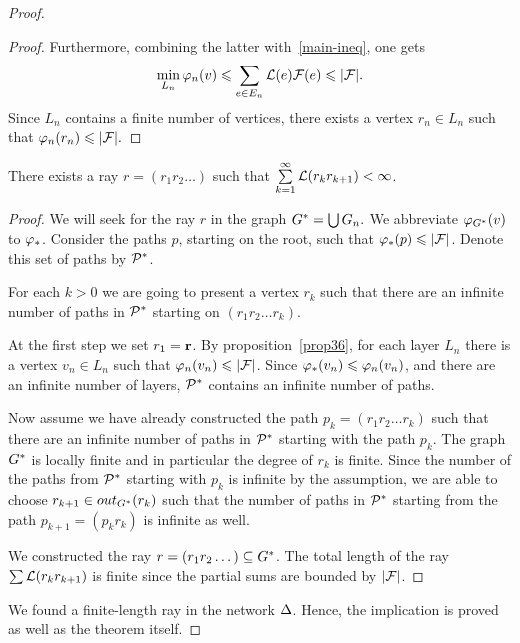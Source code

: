\documentclass[12pt,oneside,a4paper]{amsart}
\begin{document}
\begin{proof}
\begin{proof}
            Furthermore, combining the latter with~\eqref{main-ineq}, one gets
              \[
              \min_{L_n} \phi_n(v) \leq \sum_{e \in E_n} \len(e) \flowpos(e) \leq \lvert\flowpos\rvert.
              \]
            Since $L_n$ contains a finite number of vertices, there exists a vertex $r_n \in L_n$ such that
              $\phi_n(r_n) \leq \lvert\flowpos\rvert.$
          \end{proof}
          \begin{prop}
            There exists a ray $r=(r_1 r_2\dots)$ such that $\sum\limits_{k=1}^\infty \len(r_k r_{k+1}) < \infty$.
          \end{prop}
          \begin{proof}
            We will seek for the ray $r$ in the graph $\gstar = \bigcup G_n.$
            We abbreviate $\phi_{\gstar}(v)$ to $\phistar$.
            Consider the paths $p$, starting on the root, such that $\phistar(p) \leq \lvert\flowpos\rvert$.
            Denote this set of paths by $\cal{P}^*$.

            For each $k > 0$ we are going to present a vertex $r_k$ such that there are an infinite number of paths
              in $\cal{P}^*$ starting on $(r_1 r_2 \dots r_k)$.

            At the first step we set $r_1 = \root$.
            By proposition~\ref{prop36}, for each layer $L_n$ there is a vertex $v_n \in L_n$ such that
              $\phi_n(v_n) \leq \lvert\flowpos\rvert$.
            Since $\phistar(v_n) \leq \phi_n(v_n)$, and there are an infinite number of layers,
              $\cal{P}^*$ contains an infinite number of paths.

            Now assume we have already constructed the path $p_k = (r_1 r_2\dots r_k)$ such that
              there are an infinite number of paths in $\cal{P}^*$ starting with the path $p_k$.
            The graph $\gstar$ is locally finite and in particular the degree of $r_k$ is finite.
            Since the number of the paths from $\cal{P}^*$ starting with $p_k$ is infinite by the assumption,
              we are able to choose $r_{k+1} \in \eout_{G^*}(r_k)$ such that the number of paths in $\cal{P}^*$ starting from
              the path $p_{k+1}= (p_k r_k)$ is infinite as well.

            We constructed the ray $r = (r_1 r_2 \dots) \subseteq \gstar$.
            The total length of the ray $\sum \len(r_k r_{k+1})$ is finite
              since the partial sums are bounded by $\lvert \flowpos \rvert$.
          \end{proof}
          We found a finite-length ray in the network $\net$.
          Hence, the implication is proved as well as the theorem itself.
      \end{proof}
\end{document}
